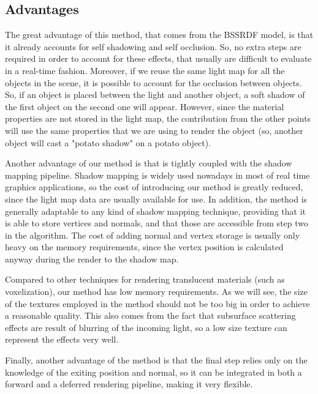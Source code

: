 \subsection{Advantages}

The great advantage of this method, that comes from the BSSRDF model, is that it already accounts for self shadowing and self occlusion. So, no extra steps are required in order to account for these effects, that usually are difficult to evaluate in a real-time fashion. Moreover, if we reuse the same light map for all the objects in the scene, it is possible to account for the occlusion between objects. So, if an object is placed between the light and another object, a soft shadow of the first object on the second one will appear. However, since the material properties are not stored in the light map, the contribution from the other points will use the same properties that we are using to render the object (so, another object will cast a "potato shadow" on a potato object).  

Another advantage of our method is that is tightly coupled with the shadow mapping pipeline. Shadow mapping is widely used nowadays in most of real time graphics applications, so the cost of introducing our method is greatly reduced, since the light map data are usually available for use. In addition, the method is generally adaptable to any kind of shadow mapping technique, providing that it is able to store vertices and normals, and that those are accessible from step two in the algorithm. The cost of adding normal and vertex storage is usually only heavy on the memory requirements, since the vertex position is calculated anyway during the render to the shadow map. 

Compared to other techniques for rendering translucent materials (such as voxelization), our method has low memory requirements. As we will see, the size of the textures employed in the method should not be too big in order to achieve a reasonable quality. This also comes from the fact that subsurface scattering effects are result of blurring of the incoming light, so a low size texture can represent the effects very well.

Finally, another advantage of the method is that the final step relies only on the knowledge of the exiting position and normal, so it can be integrated in both a forward and a deferred rendering pipeline, making it very flexible.

